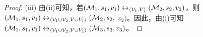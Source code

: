 \begin{proof}
	
	(iii) 由(ii)可知，若$({\cal M}_1,s_1,v_1) \leftrightarrow_{{\langle{{\cal V}_1,V}\rangle}} ({\cal M}_2,s_2,v_2)$，则$({\cal M}_1,s_1,v_1) \leftrightarrow_{{\langle{{\cal V}_1 \cup {\cal V}_2,V \cup V_1}\rangle}} ({\cal M}_2,s_2,$ $v_2)$。因此，由(i)可知$({\cal M}_1,s_1,v_1) \leftrightarrow_{{\langle{{\cal V}_1 \cup {\cal V}_2,V \cup V_1}\rangle}} ({\cal M}_3,s_3,v_3)$。	
%	
%	
%	
%	
%	
%	
%	
%	
%	

\end{proof}
